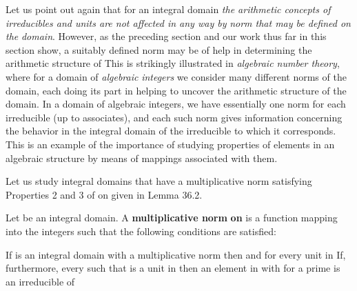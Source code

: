 \documentclass[11pt,oneside]{article}
\begin{document}
\begin{BookBody}


\noindent Let us point out again that for an integral domain  \textit{the arithmetic concepts of irre}\textit{ducibles and units are not affected in any way by}  \textit{norm that may be defined on the} \textit{domain}. However, as the preceding section and our work thus far in this section show, a suitably defined norm may be of help in determining the arithmetic structure of  This is strikingly illustrated in\textit{ algebraic number theory}, where for a domain of\textit{ algebraic} \textit{integers} we consider many different norms of the domain, each doing its part in helping to uncover the arithmetic structure of the domain. In a domain of algebraic integers, we have essentially one norm for each irreducible (up to associates), and each such norm gives information concerning the behavior in the integral domain of the irreducible to which it corresponds. This is an example of the importance of studying properties of elements in an algebraic structure by means of mappings associated with them.

Let us study integral domains that have a multiplicative norm satisfying Properties 2 and 3 of  on  given in Lemma 36.2.

 Let  be an integral domain. A\textbf{ multiplicative norm}  \textbf{on}  is a function mapping  into the integers  such that the following conditions are satisfied:


 \BookEnd{\blacksquare}

 If  is an integral domain with a multiplicative norm  then  and  for every unit  in  If, furthermore, every \BookInline{\alpha } such that  is a unit in  then an element \BookInline{\pi } in  with  for a prime  is an irreducible of 


\end{BookBody}
\end{document}
